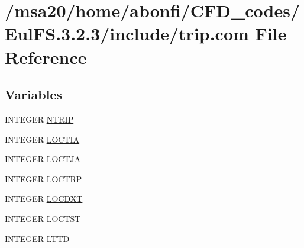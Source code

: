 \hypertarget{msa20_2home_2abonfi_2_c_f_d__codes_2_eul_f_s_83_82_83_2include_2trip_8com}{\section{/msa20/home/abonfi/\-C\-F\-D\-\_\-codes/\-Eul\-F\-S.3.2.3/include/trip.com File Reference}
\label{msa20_2home_2abonfi_2_c_f_d__codes_2_eul_f_s_83_82_83_2include_2trip_8com}
}
\subsection*{Variables}
\begin{DoxyCompactItemize}
\item 
I\-N\-T\-E\-G\-E\-R \hyperlink{msa20_2home_2abonfi_2_c_f_d__codes_2_eul_f_s_83_82_83_2include_2trip_8com_a3d7b914361a6e11bdeb7e6b866517781}{N\-T\-R\-I\-P}
\item 
I\-N\-T\-E\-G\-E\-R \hyperlink{msa20_2home_2abonfi_2_c_f_d__codes_2_eul_f_s_83_82_83_2include_2trip_8com_a9410695829be46f3379b92d229aab0aa}{L\-O\-C\-T\-I\-A}
\item 
I\-N\-T\-E\-G\-E\-R \hyperlink{msa20_2home_2abonfi_2_c_f_d__codes_2_eul_f_s_83_82_83_2include_2trip_8com_a6b0b8b0dad59abf485e0f27ae437ea82}{L\-O\-C\-T\-J\-A}
\item 
I\-N\-T\-E\-G\-E\-R \hyperlink{msa20_2home_2abonfi_2_c_f_d__codes_2_eul_f_s_83_82_83_2include_2trip_8com_a7338c756eee0f214801ca3c7c3b5f6ee}{L\-O\-C\-T\-R\-P}
\item 
I\-N\-T\-E\-G\-E\-R \hyperlink{msa20_2home_2abonfi_2_c_f_d__codes_2_eul_f_s_83_82_83_2include_2trip_8com_a23376c308ff91ab97412c3efa31ea746}{L\-O\-C\-D\-X\-T}
\item 
I\-N\-T\-E\-G\-E\-R \hyperlink{msa20_2home_2abonfi_2_c_f_d__codes_2_eul_f_s_83_82_83_2include_2trip_8com_a1da3a79d56d60efb2ec802079caef607}{L\-O\-C\-T\-S\-T}
\item 
I\-N\-T\-E\-G\-E\-R \hyperlink{msa20_2home_2abonfi_2_c_f_d__codes_2_eul_f_s_83_82_83_2include_2trip_8com_a0d4fc998108c0f869ce087a3b54bdca6}{L\-T\-T\-D}
\end{DoxyCompactItemize}


